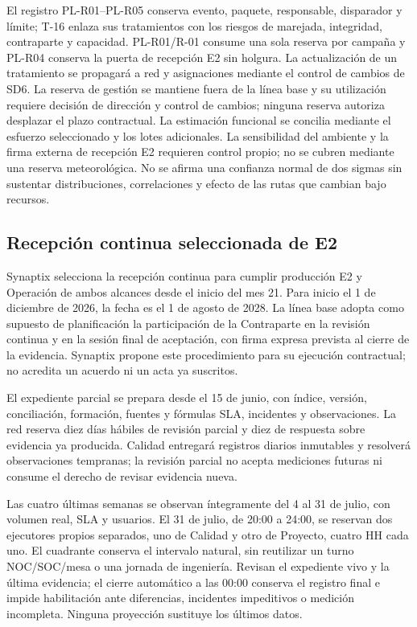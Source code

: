 El registro PL-R01--PL-R05 conserva evento, paquete, responsable, disparador y límite; T-16 enlaza sus tratamientos con los riesgos de marejada, integridad, contraparte y capacidad. PL-R01/R-01 consume una sola reserva por campaña y PL-R04 conserva la puerta de recepción E2 sin holgura. La actualización de un tratamiento se propagará a red y asignaciones mediante el control de cambios de SD6. La reserva de gestión se mantiene fuera de la línea base y su utilización requiere decisión de dirección y control de cambios; ninguna reserva autoriza desplazar el plazo contractual. La estimación funcional se concilia mediante el esfuerzo seleccionado y los lotes adicionales. La sensibilidad del ambiente y la firma externa de recepción E2 requieren control propio; no se cubren mediante una reserva meteorológica. No se afirma una confianza normal de dos sigmas sin sustentar distribuciones, correlaciones y efecto de las rutas que cambian bajo recursos.




\subsection{Recepción continua seleccionada de E2} %
Synaptix selecciona la recepción continua para cumplir producción E2 y Operación de ambos alcances desde el inicio del mes 21. Para inicio el 1 de diciembre de 2026, la fecha es el 1 de agosto de 2028. La línea base adopta como supuesto de planificación la participación de la Contraparte en la revisión continua y en la sesión final de aceptación, con firma expresa prevista al cierre de la evidencia. Synaptix propone este procedimiento para su ejecución contractual; no acredita un acuerdo ni un acta ya suscritos.~\parencite[arts.~17.2.4, 17.3 y 18; pp.~12--13]{bases-admin}

El expediente parcial se prepara desde el 15 de junio, con índice, versión, conciliación, formación, fuentes y fórmulas SLA, incidentes y observaciones. La red reserva diez días hábiles de revisión parcial y diez de respuesta sobre evidencia ya producida. Calidad entregará registros diarios inmutables y resolverá observaciones tempranas; la revisión parcial no acepta mediciones futuras ni consume el derecho de revisar evidencia nueva.

Las cuatro últimas semanas se observan íntegramente del 4 al 31 de julio, con volumen real, SLA y usuarios. El 31 de julio, de 20:00 a 24:00, se reservan dos ejecutores propios separados, uno de Calidad y otro de Proyecto, cuatro HH cada uno. El cuadrante conserva el intervalo natural, sin reutilizar un turno NOC/SOC/mesa o una jornada de ingeniería. Revisan el expediente vivo y la última evidencia; el cierre automático a las 00:00 conserva el registro final e impide habilitación ante diferencias, incidentes impeditivos o medición incompleta. Ninguna proyección sustituye los últimos datos.

